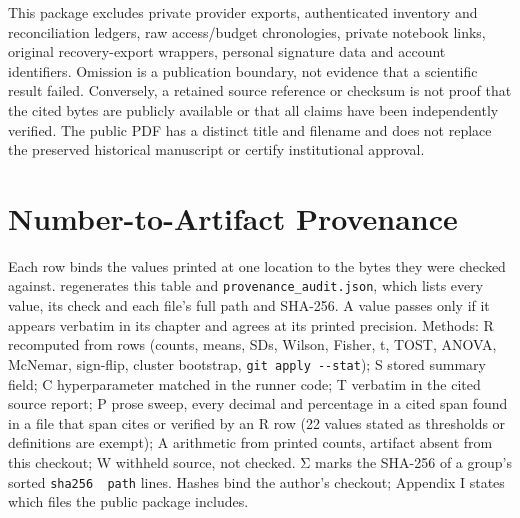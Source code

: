 \documentclass[12pt,a4paper]{report}
\DeclareRobustCommand{\longtok}[1]{\texttt{\seqsplit{#1}}}
\begin{document}
This package excludes private provider exports, authenticated inventory
and reconciliation ledgers, raw access/budget chronologies, private
notebook links, original recovery-export wrappers, personal signature
data and account identifiers. Omission is a publication boundary, not
evidence that a scientific result failed. Conversely, a retained source
reference or checksum is not proof that the cited bytes are publicly
available or that all claims have been independently verified. The
public PDF has a distinct title and filename and does not replace the
preserved historical manuscript or certify institutional approval.



\chapter{Number-to-Artifact
Provenance}\label{number-to-artifact-provenance}

Each row binds the values printed at one location to the bytes they were
checked against. \longtok{tools/audit\_\allowbreak{}thesis\_\allowbreak{}numbers.py} regenerates
this table and \texttt{provenance\_audit.json}, which lists every value,
its check and each file's full path and SHA-256. A value passes only if
it appears verbatim in its chapter and agrees at its printed precision.
Methods: R recomputed from rows (counts, means, SDs, Wilson, Fisher, t,
TOST, ANOVA, McNemar, sign-flip, cluster bootstrap,
\texttt{git\ apply\ -\/-stat}); S stored summary field; C hyperparameter
matched in the runner code; T verbatim in the cited source report; P
prose sweep, every decimal and percentage in a cited span found in a
file that span cites or verified by an R row (22 values stated as
thresholds or definitions are exempt); A arithmetic from printed counts,
artifact absent from this checkout; W withheld source, not checked. Σ
marks the SHA-256 of a group's sorted \texttt{sha256\ \ path} lines.
Hashes bind the author's checkout; Appendix I states which files the
public package includes.

\newpage
\end{document}
